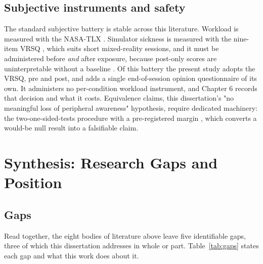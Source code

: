 \subsection{Subjective instruments and safety}

The standard subjective battery is stable across this literature. Workload is measured with the
NASA-TLX \citep{hart1988}. Simulator sickness is measured with the nine-item VRSQ \citep{kim2018}, which suits short mixed-reality sessions, and it must be administered before \textit{and}
after exposure, because post-only scores are uninterpretable without a baseline \citep{brown2022}.
Of this battery the present study adopts the VRSQ, pre and post, and adds a single end-of-session
opinion questionnaire of its own. It administers no per-condition workload instrument, and Chapter 6
records that decision and what it costs. Equivalence claims, this dissertation's "no meaningful loss
of peripheral awareness" hypothesis, require dedicated machinery: the two-one-sided-tests procedure
with a pre-registered margin \citep{lakens2017}, which converts a would-be null result into a falsifiable
claim.

\section{Synthesis: Research Gaps and Position}

\subsection{Gaps}

Read together, the eight bodies of literature above leave five identifiable gaps, three of which this
dissertation addresses in whole or part. Table~\ref{tab:gaps} states each gap and what this work does
about it.

